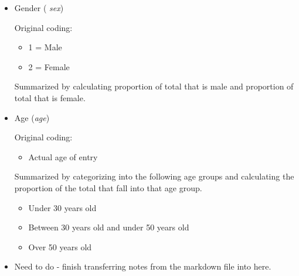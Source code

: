 \documentclass{article}
\begin{document}
\begin{itemize}
\item
Gender ( \emph{sex})

Original coding:
\begin{itemize}
\item
1 = Male
\item
2 = Female
\end{itemize}
Summarized by calculating proportion of total that is male and proportion of total that is female.

\item
Age (\emph{age})

Original coding:
\begin{itemize}
\item
Actual age of entry
\end{itemize}
Summarized by categorizing into the following age groups and calculating the proportion of the total that fall into that age group.
\begin{itemize}
\item
Under 30 years old
\item
Between 30 years old and under 50 years old
\item
Over 50 years old
\end{itemize}

\item
Need to do - finish transferring notes from the markdown file into here.

\end{itemize}
\end{document}
